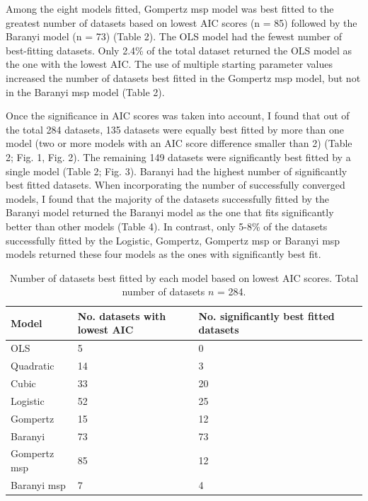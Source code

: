 \documentclass[11pt]{article}
\begin{document}
Among the eight models fitted, Gompertz msp model was best fitted to the greatest number of datasets based on lowest AIC scores (n = 85) followed by the Baranyi model (n = 73) (Table 2). The OLS model had the fewest number of best-fitting datasets. Only 2.4\% of the total dataset returned the OLS model as the one with the lowest AIC. The use of multiple starting parameter values increased the number of datasets best fitted in the Gompertz msp model, but not in the Baranyi msp model (Table 2).
\vspace{\baselineskip}

Once the significance in AIC scores was taken into account, I found that out of the total 284 datasets, 135 datasets were equally best fitted by more than one model (two or more models with an AIC score difference smaller than 2) (Table 2; Fig. 1, Fig. 2). The remaining 149 datasets were significantly best fitted by a single model (Table 2; Fig. 3). Baranyi had the highest number of significantly best fitted datasets. When incorporating the number of successfully converged models, I found that the majority of the datasets successfully fitted by the Baranyi model returned the Baranyi model as the one that fits significantly better than other models (Table 4). In contrast, only 5-8\% of the datasets successfully fitted by the Logistic, Gompertz, Gompertz msp or Baranyi msp models returned these four models as the ones with significantly best fit.
\vspace{\baselineskip}


\begin{table}[H]
\caption{Number of datasets best fitted by each model based on lowest AIC scores. Total number of datasets \(n\) = 284.}
\begin{tabular}{@{}lllll@{}}
\toprule
Model        & No. datasets with lowest AIC & No. significantly best fitted datasets &  &  \\ \midrule
OLS          & 5                            & 0                                      &  &  \\
Quadratic    & 14                           & 3                                      &  &  \\
Cubic        & 33                           & 20                                     &  &  \\
Logistic     & 52                           & 25                                     &  &  \\
Gompertz     & 15                           & 12                                     &  &  \\ 
Baranyi      & 73                           & 73                                     &  &  \\
Gompertz msp & 85                           & 12                                     &  &  \\
Baranyi msp  & 7                            & 4                                      &  & 
\end{tabular}
\end{table}
\end{document}
